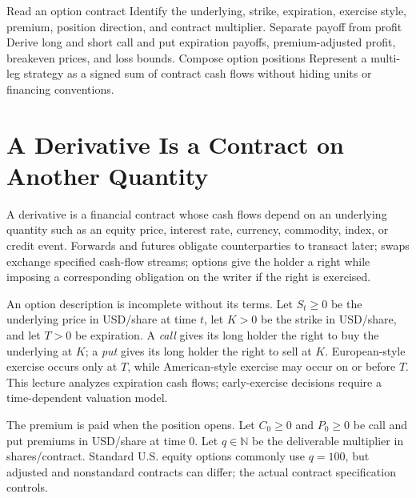 \documentclass[11pt]{article}
\begin{document}

\learningobjectives
  {Read an option contract}
  {Identify the underlying, strike, expiration, exercise style, premium, position direction, and contract multiplier.}
  {Separate payoff from profit}
  {Derive long and short call and put expiration payoffs, premium-adjusted profit, breakeven prices, and loss bounds.}
  {Compose option positions}
  {Represent a multi-leg strategy as a signed sum of contract cash flows without hiding units or financing conventions.}

\section{A Derivative Is a Contract on Another Quantity}

A derivative is a financial contract whose cash flows depend on an underlying quantity such as an equity price, interest rate, currency, commodity, index, or credit event. Forwards and futures obligate counterparties to transact later; swaps exchange specified cash-flow streams; options give the holder a right while imposing a corresponding obligation on the writer if the right is exercised.

An option description is incomplete without its terms. Let $S_t\geq0$ be the underlying price in USD/share at time $t$, let $K>0$ be the strike in USD/share, and let $T>0$ be expiration. A \emph{call} gives its long holder the right to buy the underlying at $K$; a \emph{put} gives its long holder the right to sell at $K$. European-style exercise occurs only at $T$, while American-style exercise may occur on or before $T$. This lecture analyzes expiration cash flows; early-exercise decisions require a time-dependent valuation model.

The premium is paid when the position opens. Let $C_0\geq0$ and $P_0\geq0$ be call and put premiums in USD/share at time $0$. Let $q\in\mathbb N$ be the deliverable multiplier in shares/contract. Standard U.S. equity options commonly use $q=100$, but adjusted and nonstandard contracts can differ; the actual contract specification controls.
\end{document}
